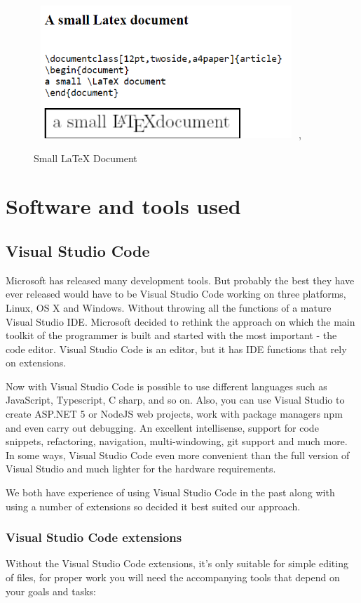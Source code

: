 \documentclass[12pt,a4paper,oneside,openany]{book}
\begin{document}
\begin{figure}[ht]
\renewcommand\thefigure{4.8}
\centering
\includegraphics[width=10cm, height=5cm]{Images/latex.png},
\caption{Small LaTeX Document}
\label{latex}
\end{figure}

\section{Software and tools used}

\subsection{Visual Studio Code}
Microsoft has released many development tools. But probably the best they have ever released would have to be Visual Studio Code working on three platforms, Linux, OS X and Windows. Without throwing all the functions of a mature Visual Studio IDE. Microsoft decided to rethink the approach on which the main toolkit of the programmer is built and started with the most important - the code editor. Visual Studio Code is an editor, but it has IDE functions that rely on extensions. 

Now with Visual Studio Code is possible to use different languages such as JavaScript, Typescript, C sharp, and so on. Also, you can use Visual Studio to create ASP.NET 5 or NodeJS web projects, work with package managers npm and even carry out debugging. An excellent intellisense, support for code snippets, refactoring, navigation, multi-windowing, git support and much more. In some ways, Visual Studio Code even more convenient than the full version of Visual Studio and much lighter for the hardware requirements.

We both have experience of using Visual Studio Code in the past along with using a number of extensions so decided it best suited our approach.

\subsubsection{Visual Studio Code extensions}
Without the Visual Studio Code extensions, it's only suitable for simple editing of files, for proper work you will need the accompanying tools that depend on your goals and tasks:
\cite{vsDocs}
\end{document}
